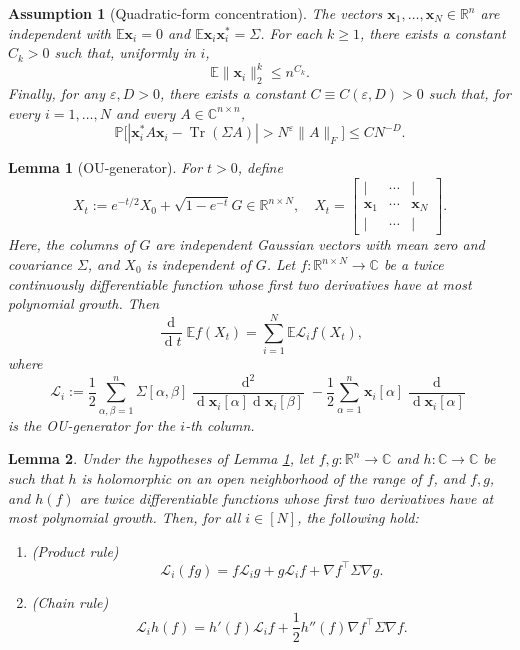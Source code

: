 \documentclass[10pt,a4paper]{amsart}
\newtheorem{assumption}{Assumption}
\newtheorem{lemma}{Lemma}
\def\C{\mathbb{C}}
\def\E{\mathbb{E}}
\def\P{\mathbb{P}}
\def\R{\mathbb{R}}
\def\Tr{\operatorname{Tr}}
\def\cL{\mathcal{L}}
\def\de{\operatorname{d}}
\def\eps{\varepsilon}
\def\x{\mathbf{x}}
\begin{document}
\begin{assumption}[Quadratic-form concentration]\label{ass:A2}
 The vectors $\x_1,\ldots,\x_N\in\R^n$ are independent with $\E\x_i = 0$ and $\E\x_i \x_i^* = \Sigma$. For each $k \geq 1$, there exists a constant $C_k>0$ such that, uniformly in $i$,
\[
 \E\|\x_i\|_2^k\le n^{C_k}.
\]
Finally, for any $\eps,D >0$, there exists a constant $C \equiv C(\eps,D)>0$ such that, for every $i = 1, \ldots, N$ and every $A\in\C^{n\times n}$,
\begin{equation}\label{eq:assumption-qf}
 \P \big[ |\x_i^*A\x_i-\Tr(\Sigma A)| > N^\eps \|A\|_F \big] \le C N^{-D}.
\end{equation}
\end{assumption}

\begin{lemma}[OU-generator]\label{lem:OU-generator}
For $t> 0$, define
\[
    X_t:=e^{-t/2}X_0+\sqrt{1-e^{-t}}G\in\R^{n\times N},\quad X_t=\begin{bmatrix}
        | & \cdots &|\\
        \x_1 & \cdots & \x_N\\
        | & \cdots & |
    \end{bmatrix}.
\]
Here, the columns of $G$ are independent Gaussian vectors with mean zero and covariance $\Sigma$, and $X_0$ is independent of $G$. Let $f:\R^{n\times N}\rightarrow\C$ be a twice continuously differentiable function whose first two derivatives have at most polynomial growth. Then
\[
    \frac{\de }{\de t}\E f(X_t)=\sum_{i=1}^N\E\cL_if(X_t),
\]
where
\[
    \cL_i:=\frac{1}{2}\sum_{\alpha,\beta=1}^n\Sigma[\alpha,\beta]\frac{\de^2}{\de\x_i[\alpha]\de\x_i[\beta]}-\frac{1}{2}\sum_{\alpha=1}^n\x_i[\alpha]\frac{\de}{\de\x_i[\alpha]}
\]
is the OU-generator for the $i$-th column.
\end{lemma}

\begin{lemma}\label{lem:product-and-chain-rule}
Under the hypotheses of Lemma \ref{lem:OU-generator}, let $f,g:\R^{n}\rightarrow\C$ and $h:\C\rightarrow\C$ be such that $h$ is holomorphic on an open neighborhood of the range of $f$, and $f,g$, and $h(f)$ are twice differentiable functions whose first two derivatives have at most polynomial growth. Then, for all $i\in[N]$, the following hold:
\begin{enumerate}
    \item (Product rule)
    \[
        \cL_i(fg)=f\cL_ig+g\cL_if+\nabla f^\top\Sigma\nabla g.
    \]
    \item (Chain rule)
    \[
        \cL_ih(f)=h'(f)\cL_if+\frac{1}{2}h''(f)\nabla f^\top\Sigma\nabla f.
    \]
\end{enumerate}
\end{lemma}
\end{document}

